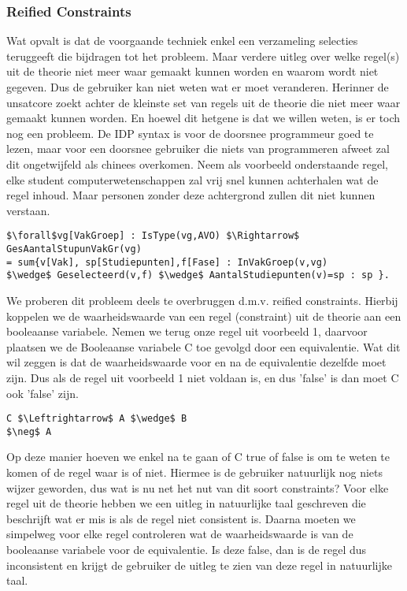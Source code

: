 \subsubsection{Reified Constraints}
Wat opvalt is dat de voorgaande techniek enkel een verzameling selecties teruggeeft die bijdragen tot het probleem. Maar verdere uitleg over welke regel(s) uit de theorie niet meer waar gemaakt kunnen worden en waarom wordt niet gegeven. Dus de gebruiker kan niet weten wat er moet veranderen. 
Herinner de unsatcore zoekt achter de kleinste set van regels uit de theorie die niet meer waar gemaakt kunnen worden. En hoewel dit hetgene is dat we willen weten, is er toch nog een probleem. 
De IDP syntax is voor de doorsnee programmeur goed te lezen, maar voor een doorsnee gebruiker die niets van programmeren afweet zal dit ongetwijfeld als chinees overkomen. Neem als voorbeeld onderstaande regel, elke student computerwetenschappen zal vrij snel kunnen achterhalen wat de regel inhoud. Maar personen zonder deze achtergrond zullen dit niet kunnen verstaan.
\begin{lstlisting}[mathescape, caption=IDP Rule Example, frame=topline/bottomline]
$\forall$vg[VakGroep] : IsType(vg,AVO) $\Rightarrow$ GesAantalStupunVakGr(vg) 
= sum{v[Vak], sp[Studiepunten],f[Fase] : InVakGroep(v,vg) 
$\wedge$ Geselecteerd(v,f) $\wedge$ AantalStudiepunten(v)=sp : sp }.
\end{lstlisting}
We proberen dit probleem deels te overbruggen d.m.v. reified constraints. Hierbij koppelen we de waarheidswaarde van een regel (constraint) uit de theorie aan een booleaanse variabele. Nemen we terug onze regel uit voorbeeld 1, daarvoor plaatsen we de Booleaanse variabele C toe gevolgd door een equivalentie. Wat dit wil zeggen is dat de waarheidswaarde voor en na de equivalentie dezelfde moet zijn. Dus als de regel uit voorbeeld 1 niet voldaan is, en dus 'false' is dan moet C ook 'false' zijn. 
\begin{lstlisting}[mathescape]
C $\Leftrightarrow$ A $\wedge$ B
$\neg$ A
\end{lstlisting}
Op deze manier hoeven we enkel na te gaan of C true of false is om te weten te komen of de regel waar is of niet. Hiermee is de gebruiker natuurlijk nog niets wijzer geworden, dus wat is nu net het nut van dit soort constraints? Voor elke regel uit de theorie hebben we een uitleg in natuurlijke taal geschreven die beschrijft wat er mis is als de regel niet consistent is. Daarna moeten we simpelweg voor elke regel controleren wat de waarheidswaarde is van de booleaanse variabele voor de equivalentie. Is deze false, dan is de regel dus inconsistent en krijgt de gebruiker de uitleg te zien van deze regel in natuurlijke taal. 

